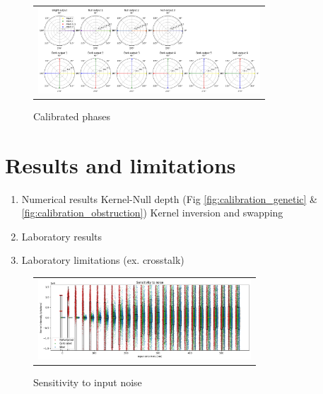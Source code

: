 \documentclass{aa}
\begin{document}
    \begin{figure}[H]
        \begin{center}
        \begin{tabular}{c}
        \includegraphics[height=3.2cm]{img/calibrated_phases.png}
        \end{tabular}
        \end{center}
        \caption[calibrated_phases] 
        { \label{fig:calibrated_phases} 
        Calibrated phases}
    \end{figure}


\section{Results and limitations}

    \begin{enumerate}
        \item Numerical results
        \subitem Kernel-Null depth (Fig \ref{fig:calibration_genetic} \& \ref{fig:calibration_obstruction})
        \subitem Kernel inversion and swapping 
        \item Laboratory results
        \item Laboratory limitations (ex. crosstalk)
    \end{enumerate}

    \begin{figure}[H]
        \begin{center}
        \begin{tabular}{c}
        \includegraphics[height=3cm]{img/noise_sensitivity.png}
        \end{tabular}
        \end{center}
        \caption[noise_sensitivity] 
        { \label{fig:noise_sensitivity} 
        Sensitivity to input noise}
    \end{figure}
\end{document}
